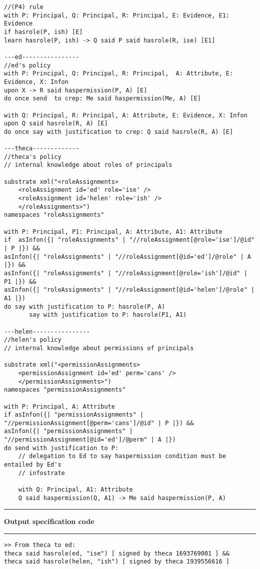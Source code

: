 \documentclass[conference]{llncs}
\begin{document}
{\begin{verbatim}
//(P4) rule
with P: Principal, Q: Principal, R: Principal, E: Evidence, E1: Evidence 
if hasrole(P, ish) [E]
learn hasrole(P, ish) -> Q said P said hasrole(R, ise) [E1] 

---ed----------------
//ed's policy
with P: Principal, Q: Principal, R: Principal,  A: Attribute, E: Evidence, X: Infon
upon X -> R said haspermission(P, A) [E]
do once send  to crep: Me said haspermission(Me, A) [E]

with Q: Principal, R: Principal, A: Attribute, E: Evidence, X: Infon
upon Q said hasrole(R, A) [E]
do once say with justification to crep: Q said hasrole(R, A) [E]

---theca-------------
//theca's policy
// internal knowledge about roles of principals

substrate xml("<roleAssignments>
	<roleAssignment id='ed' role='ise' />
	<roleAssignment id='helen' role='ish' />
	</roleAssignments>")
namespaces "roleAssignments"
		
with P: Principal, P1: Principal, A: Attribute, A1: Attribute
if  asInfon({| "roleAssignments" | "//roleAssignment[@role='ise']/@id" | P |}) &&
asInfon({| "roleAssignments" | "//roleAssignment[@id='ed']/@role" | A |}) &&
asInfon({| "roleAssignments" | "//roleAssignment[@role='ish']/@id" | P1 |}) &&
asInfon({| "roleAssignments" | "//roleAssignment[@id='helen']/@role" | A1 |}) 
do say with justification to P: hasrole(P, A)
	   say with justification to P: hasrole(P1, A1)
		
---helen----------------
//helen's policy
// internal knowledge about permissions of principals

substrate xml("<permissionAssignments>
	<permissionAssignment id='ed' perm='cans' />
	</permissionAssignments>")
namespaces "permissionAssignments"

with P: Principal, A: Attribute
if asInfon({| "permissionAssignments" | "//permissionAssignment[@perm='cans']/@id" | P |}) &&
asInfon({| "permissionAssignments" | "//permissionAssignment[@id='ed']/@perm" | A |})
do send with justification to P:
	// delegation to Ed to say haspermission condition must be entailed by Ed's 
	// infostrate
	
	with Q: Principal, A1: Attribute
	Q said haspermission(Q, A1) -> Me said haspermission(P, A)	
	\end{verbatim}
	\hrule
\vspace*{.2cm}
\textbf{Output specification code}
\vspace*{.2cm}
\hrule
\small
\begin{verbatim}
>> From theca to ed:
theca said hasrole(ed, "ise") [ signed by theca 1693769001 ] &&
theca said hasrole(helen, "ish") [ signed by theca 1939556616 ]
 

\end{verbatim}}
\end{document}
